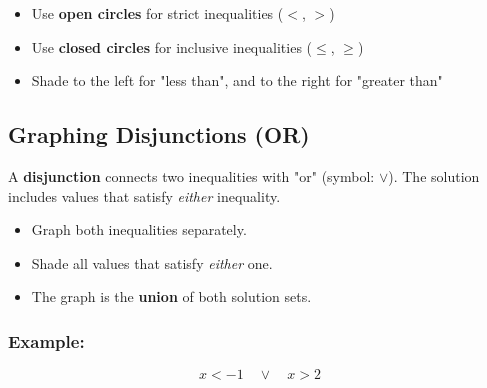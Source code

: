 \documentclass[11pt]{article}
\begin{document}
\begin{center}
\end{center}

\begin{tcolorbox}[colback=blue!5!white, colframe=blue!80!black, title=Summary]
\begin{itemize}
  \item Use \textbf{open circles} for strict inequalities (\( < \), \( > \))
  \item Use \textbf{closed circles} for inclusive inequalities (\( \leq \), \( \geq \))
  \item Shade to the left for "less than", and to the right for "greater than"
\end{itemize}
\end{tcolorbox}

\subsection{Graphing Disjunctions (OR)}

A \textbf{disjunction} connects two inequalities with "or" (symbol: \(\lor\)).
The solution includes values that satisfy \emph{either} inequality.

\begin{itemize}
  \item Graph both inequalities separately.
  \item Shade all values that satisfy \emph{either} one.
  \item The graph is the \textbf{union} of both solution sets.
\end{itemize}

\subsubsection*{Example:}

\[
x < -1 \quad \lor \quad x > 2
\]

\begin{center}
\end{center}
\end{document}

